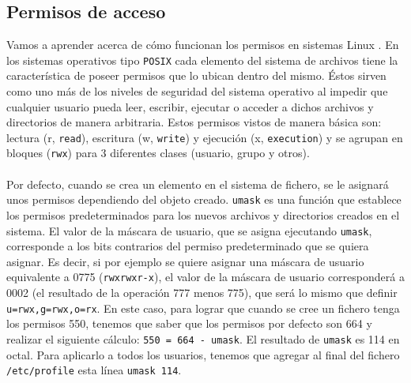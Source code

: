 \documentclass[10pt]{article}
\begin{document}
	\subsection{Permisos de acceso}
	Vamos a aprender acerca de cómo funcionan los permisos en sistemas Linux \cite{umask}. En los sistemas operativos tipo \verb|POSIX| cada elemento del sistema de archivos tiene la característica de poseer permisos que lo ubican dentro del mismo. Éstos sirven como uno más de los niveles de seguridad del sistema operativo al impedir que cualquier usuario pueda leer, escribir, ejecutar o acceder a dichos archivos y directorios de manera arbitraria. Estos permisos vistos de manera básica son: lectura (r, \verb|read|), escritura (w, \verb|write|) y ejecución (x, \verb|execution|) y se agrupan en bloques (\verb|rwx|) para 3 diferentes clases (usuario, grupo y otros).\\\\
	Por defecto, cuando se crea un elemento en el sistema de fichero, se le asignará unos permisos dependiendo del objeto creado. \verb|umask| es una función que establece los permisos predeterminados para los nuevos archivos y directorios creados en el sistema. El valor de la máscara de usuario, que se asigna ejecutando \verb|umask|, corresponde a los bits contrarios del permiso predeterminado que se quiera asignar. Es decir, si por ejemplo se quiere asignar una máscara de usuario equivalente a 0775 (\verb|rwxrwxr-x|), el valor de la máscara de usuario corresponderá a 0002 (el resultado de la operación 777 menos 775), que será lo mismo que definir \verb|u=rwx,g=rwx,o=rx|. En este caso, para lograr que cuando se cree un fichero tenga los permisos 550, tenemos que saber que los permisos por defecto son 664 y realizar el siguiente cálculo: \verb|550 = 664 - umask|. El resultado de \verb|umask| es 114 en octal. Para aplicarlo a todos los usuarios, tenemos que agregar al final del fichero \verb|/etc/profile| esta línea \verb|umask 114|.
\end{document}
